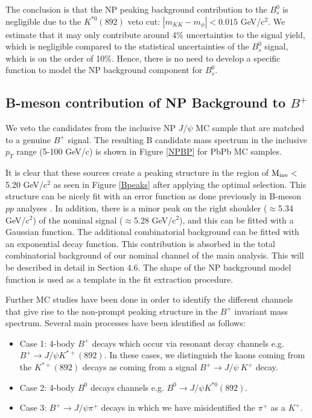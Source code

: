  

The conclusion is that the NP peaking background contribution to the $B^0_s$ is negligible due to the $K^{*0} (892)$ veto cut: $|m_{KK} - m_\phi| < 0.015$ GeV/c$^2$. We estimate that it may only contribute around 4\% uncertainties to the signal yield, which is negligible compared to the statistical uncertainties of the $B^0_s$ signal, which is on the order of 10\%. Hence, there is no need to develop a specific function to model the NP background component for $B^0_s$.


\subsection{B-meson contribution of NP Background to $B^+$}

We veto the candidates from the inclusive NP $J/\psi$ MC sample that are matched to a genuine $B^+$ signal. The resulting B candidate mass spectrum in the inclusive $p_T$ range (5-100 GeV/c) is shown in Figure \ref{NPBP} for PbPb MC samples. 

It is clear that these sources create a peaking structure in the region of $\rm M_{inv}<$5.20 GeV/c$^2$ as seen in Figure \ref{Bpeaks} after applying the optimal selection. This structure can be nicely fit with an error function as done previously in B-meson $pp$ analyses \cite{CMSBPH}. In addition, there is a minor peak on the right shoulder ($\approx$5.34 GeV/c$^2$) of the nominal signal ($\approx$5.28 GeV/c$^2$), and this can be fitted with a Gaussian function. The additional combinatorial background can be fitted with an exponential decay function. This contribution is absorbed in the total combinatorial background of our nominal channel of the main analysis. This will be described in detail in Section 4.6. The shape of the NP background model function is used as a template in the fit extraction procedure. 

Further MC studies have been done in order to identify the different channels that give rise to the non-prompt peaking structure in the $B^+$ invariant mass spectrum. Several main processes have been identified as follows:

\begin{itemize}
\item Case 1: 4-body $B^+$ decays which occur via resonant decay channels e.g. $B^+\rightarrow J/\psi K^{*+}(892)$. In these cases, we distinguish the kaons coming from the $K^{*+}(892)$ decays as coming from a signal $B^+\rightarrow J/\psi~K^+$ decay. 
\item Case 2: 4-body $B^0$ decays channels e.g. $B^0\rightarrow J/\psi K^{*0}(892)$.
\item Case 3: $B^+\rightarrow J/\psi\pi^+$ decays in which we have misidentified the $\pi^+$ as a $K^+$.
\end{itemize}

